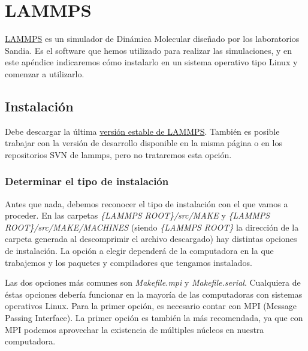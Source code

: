 
\chapter{LAMMPS} %

\label{AA} %


\href{lammps.sandia.gov}{LAMMPS} es un simulador de Dinámica Molecular diseñado por los laboratorios Sandia. Es el software que hemos utilizado para realizar las simulaciones, y en este apéndice indicaremos cómo instalarlo en un sistema operativo tipo Linux y comenzar a utilizarlo.

\section{Instalación}
\label{AA_1}

Debe descargar la última \href{http://lammps.sandia.gov/download.html#tar}{versión estable de LAMMPS}. También es posible trabajar con la versión de desarrollo disponible en la misma página o en los repositorios SVN de lammps, pero no trataremos esta opción.

\subsection{Determinar el tipo de instalación}
\label{AA_1_1}

Antes que nada, debemos reconocer el tipo de instalación con el que vamos a proceder. En las carpetas \textit{\{LAMMPS ROOT\}/src/MAKE} y \textit{\{LAMMPS ROOT\}/src/MAKE/MACHINES} (siendo \textit{\{LAMMPS ROOT\}} la dirección de la carpeta generada al descomprimir el archivo descargado) hay distintas opciones de instalación. La opción a elegir dependerá de la computadora en la que trabajemos y los paquetes y compiladores que tengamos instalados.

Las dos opciones más comunes son \textit{Makefile.mpi} y \textit{Makefile.serial}. Cualquiera de éstas opciones debería funcionar en la mayoría de las computadoras con sistemas operativos Linux. Para la primer opción, es necesario contar con MPI (Message Passing Interface). La primer opción es también la más recomendada, ya que con MPI podemos aprovechar la existencia de múltiples núcleos en nuestra computadora.

